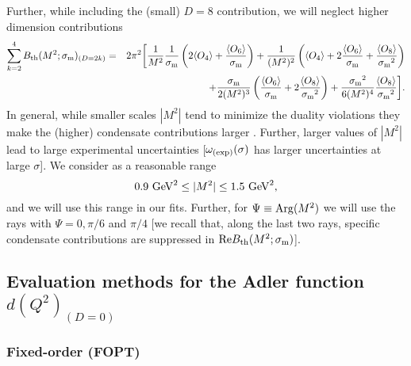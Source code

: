 \documentclass[aps,nofootinbib,showkeys,noshowpacs,preprintnumbers,amsmath,amssymb]{revtex4}
\def\be{\begin{equation}}
\def\ee{\end{equation}}
\def\bea{\begin{eqnarray}}
\def\eea{\end{eqnarray}}
\newcommand{\sm}{{\sigma_{\rm m}}}
\newcommand{\sg}{{\sigma}}
\begin{document}
Further, while including the (small) $D=8$ contribution, we will neglect higher dimension contributions
\bea
\sum_{k=2}^4 B_{\rm th}(M^2; \sm)_{(D=2 k)} & = & 2 \pi^2 {\bigg [} \frac{1}{M^2} \frac{1}{\sm} \left( 2 \langle O_4 \rangle + \frac{ \langle O_6 \rangle}{\sm} \right) + \frac{1}{(M^2)^2} \left( \langle O_4 \rangle + 2 \frac{ \langle O_6 \rangle}{\sm} + \frac{ \langle O_8 \rangle}{\sm^2} \right)
\nonumber\\
&& + \frac{\sm}{2 (M^2)^3} \left( \frac{ \langle O_6 \rangle}{\sm}  +2 \frac{ \langle O_8 \rangle}{\sm^2} \right) + \frac{\sm^2}{6 (M^2)^4} \frac{\langle O_8 \rangle}{\sm^2} {\bigg ]}.
\label{BthD468} \eea
In general, while smaller scales $|M^2|$ tend to minimize the duality violations they make the (higher) condensate contributions larger \cite{Pich}. Further, larger values of $|M^2|$ lead to large experimental uncertainties [$\omega_{\rm (exp)}(\sg)$ has larger uncertainties at large $\sg$]. We consider as a reasonable range
\be
0.9 \ {\rm GeV}^2 \leq |M^2| \leq 1.5 \ {\rm GeV}^2,
\label{rangeM2} \ee
and we will use this range in our fits. Further, for $\Psi \equiv {\rm Arg}(M^2)$ we will use the rays with $\Psi=0, \pi/6$ and $\pi/4$ [we recall that, along the last two rays, specific condensate contributions are suppressed in ${\rm Re} B_{\rm th}(M^2; \sm)$].


\subsection{Evaluation methods for the Adler function $d(Q^2)_{(D=0)}$}
\label{subs:evalm}

\subsubsection{Fixed-order (FOPT)}
\label{ssubs:FO}
\end{document}
